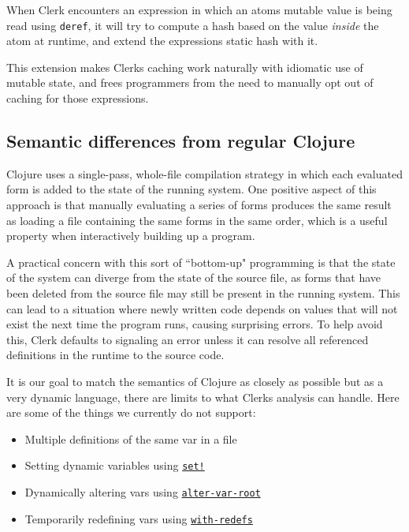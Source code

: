 \documentclass[sigconf,screen,pbalance=true]{acmart}
\newcommand{\passthrough}[1]{#1}
\providecommand{\tightlist}{%
  \setlength{\itemsep}{0pt}\setlength{\parskip}{0pt}}
\begin{document}
When Clerk encounters an expression in which an atom\textquotesingle s mutable value is being read using \passthrough{\lstinline!deref!}, it will try to compute a hash based on the value \emph{inside} the atom  at runtime, and extend the expression\textquotesingle s static hash with it.

This extension makes Clerk\textquotesingle s caching work naturally with idiomatic use of mutable state, and frees programmers from the need to manually opt out of caching for those expressions.

\hypertarget{semantic-differences-from-regular-clojure}{%
\subsection{Semantic differences from regular Clojure}\label{semantic-differences-from-regular-clojure}}

Clojure uses a single-pass, whole-file compilation strategy in which each evaluated form is added to the state of the running system. One positive aspect of this approach is that manually evaluating a series of forms produces the same result as loading a file containing the same forms in the same order, which is a useful property when interactively building up a program.

A practical concern with this sort of ``bottom-up" programming is that the state of the system can diverge from the state of the source file, as forms that have been deleted from the source file may still be present in the running system. This can lead to a situation where newly written code depends on values that will not exist the next time the program runs, causing surprising errors. To help avoid this, Clerk defaults to signaling an error unless it can resolve all referenced definitions in the runtime to the source code.

It is our goal to match the semantics of Clojure as closely as possible but as a very dynamic language, there are limits to what Clerk\textquotesingle s analysis can handle. Here are some of the things we currently do not support:

\begin{itemize}
\tightlist
\item
  Multiple definitions of the same var in a file
\item
  Setting dynamic variables using {\href{https://clojuredocs.org/clojure.core/set!}{\passthrough{\lstinline"set!"}}}
\item
  Dynamically altering vars using {\href{https://clojuredocs.org/clojure.core/alter-var-root}{\passthrough{\lstinline!alter-var-root!}}}
\item
  Temporarily redefining vars using {\href{https://clojuredocs.org/clojure.core/with-redefs}{\passthrough{\lstinline!with-redefs!}}}
\end{itemize}
\end{document}
